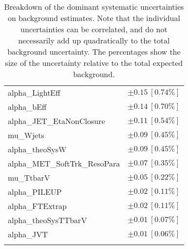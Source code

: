\begin{table}
\begin{center}
\begin{tabular*}{\textwidth}{@{\extracolsep{\fill}}lc}
alpha\_LightEff         & $\pm 0.15\ [0.74\%] $       \\
alpha\_bEff         & $\pm 0.14\ [0.70\%] $       \\
alpha\_JET\_EtaNonClosure         & $\pm 0.11\ [0.54\%] $       \\
mu\_Wjets         & $\pm 0.09\ [0.45\%] $       \\
alpha\_theoSysW         & $\pm 0.09\ [0.45\%] $       \\
alpha\_MET\_SoftTrk\_ResoPara         & $\pm 0.07\ [0.35\%] $       \\
mu\_TtbarV         & $\pm 0.05\ [0.22\%] $       \\
alpha\_PILEUP         & $\pm 0.02\ [0.11\%] $       \\
alpha\_FTExtrap         & $\pm 0.02\ [0.11\%] $       \\
alpha\_theoSysTTbarV         & $\pm 0.01\ [0.07\%] $       \\
alpha\_JVT         & $\pm 0.01\ [0.06\%] $       \\
\noalign{\smallskip}\hline\noalign{\smallskip}
\end{tabular*}
\end{center}
\caption[Breakdown of uncertainty on background estimates]{
Breakdown of the dominant systematic uncertainties on background estimates.
Note that the individual uncertainties can be correlated, and do not necessarily add up quadratically to 
the total background uncertainty. The percentages show the size of the uncertainty relative to the total expected background.
\label{table.results.bkgestimate.uncertainties.SRC1}}
\end{table}
%